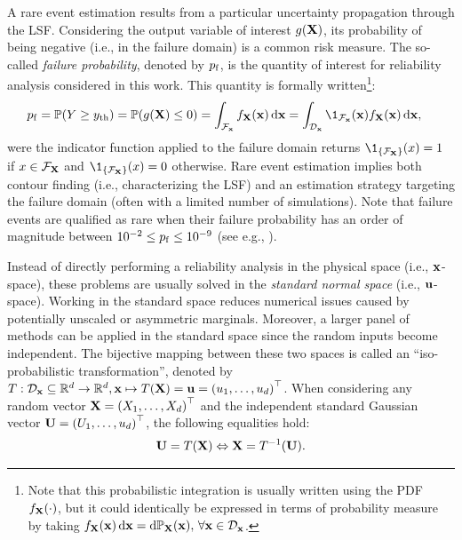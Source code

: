 A rare event estimation results from a particular uncertainty propagation through the LSF. 
Considering the output variable of interest $g({\bf X})$, its probability of being negative (i.e., in the failure domain) is a common risk measure. 
The so-called \textit{failure probability}, denoted by $p_\mathrm{f}$, is the quantity of interest for reliability analysis considered in this work. 
This quantity is formally written\footnote{Note that this probabilistic integration is usually written using the PDF $f_{\bf X}(\cdot)$, but it could identically be expressed in terms of probability measure by taking $f_{\bf X}({\bf x}) \, \mathrm{d}{\bf x} = \mathrm{d} \mathbb{P}_{{\bf X}}({\bf x}), \, \forall {\bf x} \in \mathcal{D}_{\bf x}$.}: 
\begin{equation}
    \begin{split}
        \pf = \P(Y \geq \yth) &= \P(g(\bX) \leq 0) = \int_{\iF_\bx} f_\bX(\bx) \, \dd\bx
        = \int_{\iD_\bx} \1_{\iF_\bx}(\bx) f_\bX(\bx) \, \dd\bx,
    \end{split}
    \label{eq:pf}
\end{equation}
were the indicator function applied to the failure domain returns $\1_{\left\{\iF_{\bX}\right\}}(x) = 1$ if $x \in \mathcal{F}_{{\bf X}}$ and $\1_{\left\{\iF_{\bX}\right\}}(x) = 0$ otherwise. 
Rare event estimation implies both contour finding (i.e., characterizing the LSF) and an estimation strategy targeting the failure domain (often with a limited number of simulations). 
Note that failure events are qualified as rare when their failure probability has an order of magnitude between $10^{-2} \leq p_\mathrm{f} \leq 10^{-9}$ (see e.g., \citealt{lemaire_2013}). 

Instead of directly performing a reliability analysis in the physical space (i.e., ${\bf x}$-space), these problems are usually solved in the \emph{standard normal space} (i.e., ${\bf u}$-space). 
Working in the standard space reduces numerical issues caused by potentially unscaled or asymmetric marginals. 
Moreover, a larger panel of methods can be applied in the standard space since the random inputs become independent.   
The bijective mapping between these two spaces is called an ``iso-probabilistic transformation'', 
denoted by $T: \mathcal{D}_{{\bf x}} \subseteq \mathbb{R}^d \rightarrow \mathbb{R}^d, {\bf x} \mapsto T({\bf X}) = {\bf u} = \left(u_1, \dots, u_d\right)^\top$. 
When considering any random vector ${\bf X} = \left(X_1, \dots, X_d\right)^\top$ and the independent standard Gaussian vector ${\bf U} = \left(U_1, \dots, u_d\right)^\top$, the following equalities hold:
\begin{equation}
    {\bf U} = T({\bf X}) \Leftrightarrow {\bf X} = T^{-1}({\bf U}).
\end{equation} 

